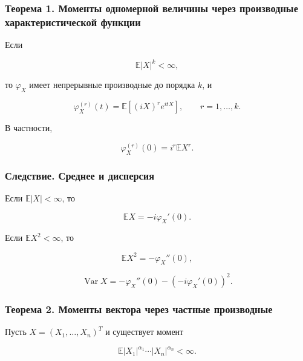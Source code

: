 \documentclass[
  11pt,
  a4paper,
]{article}
\begin{document}
\subsubsection{Теорема 1. Моменты одномерной величины через производные
характеристической
функции}\label{ux442ux435ux43eux440ux435ux43cux430-1.-ux43cux43eux43cux435ux43dux442ux44b-ux43eux434ux43dux43eux43cux435ux440ux43dux43eux439-ux432ux435ux43bux438ux447ux438ux43dux44b-ux447ux435ux440ux435ux437-ux43fux440ux43eux438ux437ux432ux43eux434ux43dux44bux435-ux445ux430ux440ux430ux43aux442ux435ux440ux438ux441ux442ux438ux447ux435ux441ux43aux43eux439-ux444ux443ux43dux43aux446ux438ux438}

Если

\[
\mathbb E|X|^k<\infty,
\]

то \(\varphi_X\) имеет непрерывные производные до порядка \(k\), и

\[
\varphi_X^{(r)}(t)
=
\mathbb E[(iX)^r e^{itX}],
\qquad r=1,\ldots,k.
\]

В частности,

\[
\varphi_X^{(r)}(0)=i^r\mathbb EX^r.
\]

\subsubsection{Следствие. Среднее и
дисперсия}\label{ux441ux43bux435ux434ux441ux442ux432ux438ux435.-ux441ux440ux435ux434ux43dux435ux435-ux438-ux434ux438ux441ux43fux435ux440ux441ux438ux44f}

Если \(\mathbb E|X|<\infty\), то

\[
\mathbb EX=-i\varphi_X'(0).
\]

Если \(\mathbb EX^2<\infty\), то

\[
\mathbb EX^2=-\varphi_X''(0),
\]

\[
\operatorname{Var}X=-\varphi_X''(0)-(-i\varphi_X'(0))^2.
\]

\subsubsection{Теорема 2. Моменты вектора через частные
производные}\label{ux442ux435ux43eux440ux435ux43cux430-2.-ux43cux43eux43cux435ux43dux442ux44b-ux432ux435ux43aux442ux43eux440ux430-ux447ux435ux440ux435ux437-ux447ux430ux441ux442ux43dux44bux435-ux43fux440ux43eux438ux437ux432ux43eux434ux43dux44bux435}

Пусть \(X=(X_1,\ldots,X_n)^T\) и существует момент

\[
\mathbb E|X_1|^{\alpha_1}\cdots |X_n|^{\alpha_n}<\infty.
\]
\end{document}
